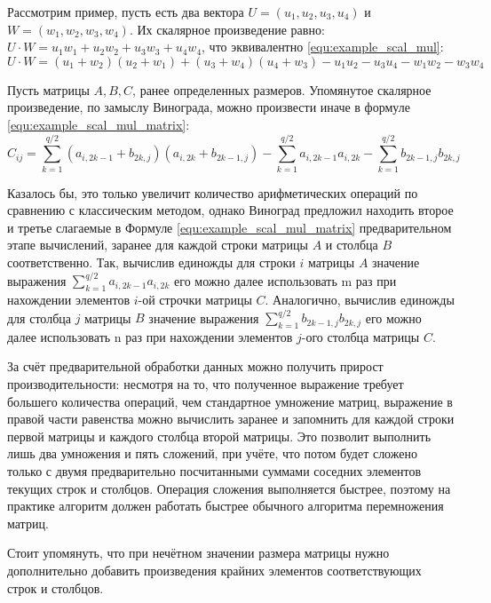 Рассмотрим пример, пусть есть два вектора $U = (u_1, u_2, u_3, u_4)$ и $W = (w_1, w_2, w_3, w_4)$. Их скалярное произведение равно: $U \cdot W = u_1w_1 + u_2w_2 + u_3w_3 + u_4w_4$, что
эквивалентно \ref{equ:example_scal_mul}:
\begin{equation} 
	\label{equ:example_scal_mul}
	U \cdot W = (u_1 + w_2)(u_2 + w_1) + (u_3 + w_4)(u_4 + w_3) - u_1u_2 - u_3u_4 - w_1w_2 - w_3w_4
\end{equation}

Пусть матрицы $A, B, C$, ранее определенных размеров. Упомянутое скалярное произведение, по замыслу Винограда, можно произвести иначе в формуле \ref{equ:example_scal_mul_matrix}:
\begin{equation} 
	\label{equ:example_scal_mul_matrix}
	C_{ij} = \sum_{k=1}^{q/2}(a_{i,2k-1} + b_{2k,j})(a_{i,2k} + b_{2k-1,j}) - \sum_{k=1}^{q/2} a_{i,2k-1}a_{i,2k} - \sum_{k=1}^{q/2} b_{2k-1,j}b_{2k,j}
\end{equation}

Казалось бы, это только увеличит количество арифметических операций по сравнению с классическим методом, однако Виноград предложил находить второе и третье слагаемые в Формуле \ref{equ:example_scal_mul_matrix} предварительном этапе вычислений, заранее для каждой строки матрицы $A$ и столбца $B$ соответственно. Так, вычислив единожды для строки $i$ матрицы $A$ значение выражения $\sum_{k=1}^{q/2}a_{i,2k-1}a_{i,2k}$ его можно далее использовать m раз при нахождении элементов $i$-ой строчки матрицы $C$. Аналогично, вычислив единожды для
столбца $j$ матрицы $B$ значение выражения $\sum_{k=1}^{q/2} b_{2k-1,j}b_{2k,j}$ его можно
далее использовать n раз при нахождении элементов $j$-ого столбца матрицы $C$. \cite{book_vinograd}

За счёт предварительной обработки данных можно получить прирост производительности: несмотря на то, что полученное выражение требует большего количества операций, чем стандартное умножение матриц, выражение в правой части равенства можно вычислить заранее и запомнить для каждой строки первой матрицы и каждого столбца второй матрицы. Это позволит выполнить лишь два умножения и пять сложений, при учёте, что потом будет сложено только с двумя предварительно посчитанными суммами соседних элементов текущих строк и столбцов. Операция сложения выполняется
быстрее, поэтому на практике алгоритм должен работать быстрее обычного алгоритма перемножения матриц.

Стоит упомянуть, что при нечётном значении размера матрицы нужно дополнительно добавить произведения крайних элементов соответствующих строк и столбцов.

